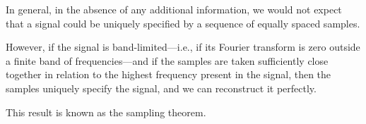 \begin{frame}
    In general, in the absence of any additional information, we would not expect that a signal could be uniquely specified by a sequence of equally spaced samples.
    {
        \centering
        
    }
    \par
    However, if the signal is band-limited---i.e., if its Fourier transform is zero outside a finite band of frequencies---and if the samples are taken sufficiently close together in relation to the highest frequency present in the signal, then the samples uniquely specify the signal, and we can reconstruct it perfectly.\par \par
    This result is known as the \alert{sampling theorem}.
\end{frame}



